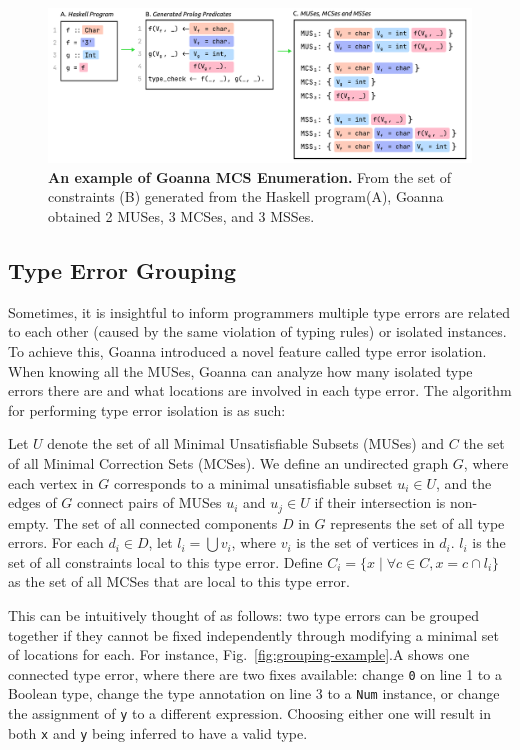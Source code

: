 \documentclass[pdflatex,lineno,sn-nature,Numbered]{sn-jnl}%
\begin{document}
     \begin{figure}[ht!]
        \centering
        \includegraphics[width=\linewidth]{images/Enumeration-Example}
        \caption{\textbf{An example of Goanna MCS Enumeration.} From the set of constraints (B) generated from the Haskell program(A), Goanna obtained 2 MUSes, 3 MCSes, and 3 MSSes. }
        \label{fig:enumeration-example}
    \end{figure}
    


\subsection{Type Error Grouping} \label{sub:grouping}

Sometimes, it is insightful to inform programmers multiple type errors are related to each other (caused by the same violation of typing rules) or isolated instances. To achieve this, Goanna introduced a novel feature called type error isolation. When knowing all the MUSes, Goanna can analyze how many isolated type errors there are and what locations are involved in each type error. The algorithm for performing type error isolation is as such:


	Let $U$ denote the set of all Minimal Unsatisfiable Subsets (MUSes) and $C$ the set of all Minimal Correction Sets (MCSes). We define an undirected graph $G$, where each vertex in $G$ corresponds to a minimal unsatisfiable subset $u_i \in U$, and the edges of $G$ connect pairs of MUSes $u_i$ and $u_j \in U$ if their intersection is non-empty. The set of all connected components $D$ in $G$ represents the set of all type errors. For each $d_i \in D$, let $l_i = \bigcup v_i$, where $v_i$ is the set of vertices in $d_i$. $l_i$ is the set of all constraints local to this type error. Define $C_i = \{ x \mid \forall c \in C, x = c \cap l_i \}$ as the set of all MCSes that are local to this type error.


    This can be intuitively thought of as follows: two type errors can be grouped together if they cannot be fixed independently through modifying a minimal set of locations for each. For instance, Fig.~\ref{fig:grouping-example}.A shows one connected type error, where there are two fixes available: change \texttt{0} on line 1 to a Boolean type, change the type annotation on line 3 to a \texttt{Num} instance, or change the assignment of \texttt{y} to a different expression. Choosing either one will result in both \texttt{x} and \texttt{y} being inferred to have a valid type.
    
\end{document}

